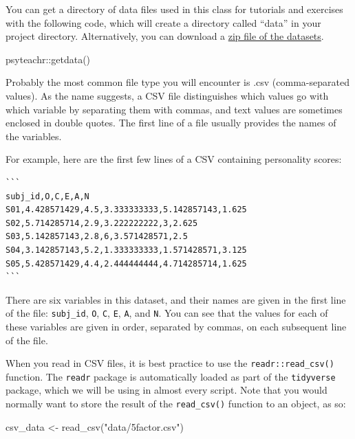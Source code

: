 \documentclass[
  oneside]{book}
\newenvironment{Shaded}{\begin{snugshade}}{\end{snugshade}}
\newcommand{\FunctionTok}[1]{\textcolor[rgb]{0.00,0.00,0.00}{#1}}
\newcommand{\NormalTok}[1]{#1}
\newcommand{\OtherTok}[1]{\textcolor[rgb]{0.56,0.35,0.01}{#1}}
\newcommand{\SpecialCharTok}[1]{\textcolor[rgb]{0.00,0.00,0.00}{#1}}
\newcommand{\StringTok}[1]{\textcolor[rgb]{0.31,0.60,0.02}{#1}}
\begin{document}
You can get a directory of data files used in this class for tutorials and exercises with the following code, which will create a directory called ``data'' in your project directory. Alternatively, you can download a \href{data/data.zip}{zip file of the datasets}.

\begin{Shaded}
\begin{Highlighting}[]
\NormalTok{psyteachr}\SpecialCharTok{::}\FunctionTok{getdata}\NormalTok{()}
\end{Highlighting}
\end{Shaded}

Probably the most common file type you will encounter is .csv (comma-separated values). As the name suggests, a CSV file distinguishes which values go with which variable by separating them with commas, and text values are sometimes enclosed in double quotes. The first line of a file usually provides the names of the variables.

For example, here are the first few lines of a CSV containing personality scores:

\begin{verbatim}
```
subj_id,O,C,E,A,N
S01,4.428571429,4.5,3.333333333,5.142857143,1.625
S02,5.714285714,2.9,3.222222222,3,2.625
S03,5.142857143,2.8,6,3.571428571,2.5
S04,3.142857143,5.2,1.333333333,1.571428571,3.125
S05,5.428571429,4.4,2.444444444,4.714285714,1.625
```
\end{verbatim}

There are six variables in this dataset, and their names are given in the first line of the file: \texttt{subj\_id}, \texttt{O}, \texttt{C}, \texttt{E}, \texttt{A}, and \texttt{N}. You can see that the values for each of these variables are given in order, separated by commas, on each subsequent line of the file.

When you read in CSV files, it is best practice to use the \texttt{readr::read\_csv()} function. The \texttt{readr} package is automatically loaded as part of the \texttt{tidyverse} package, which we will be using in almost every script. Note that you would normally want to store the result of the \texttt{read\_csv()} function to an object, as so:

\begin{Shaded}
\begin{Highlighting}[]
\NormalTok{csv\_data }\OtherTok{\textless{}{-}} \FunctionTok{read\_csv}\NormalTok{(}\StringTok{"data/5factor.csv"}\NormalTok{)}
\end{Highlighting}
\end{Shaded}
\end{document}
